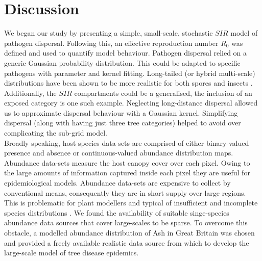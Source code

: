 \section{Discussion}
\label{section:disscussion}
We began our study by presenting a simple, small-scale, stochastic $SIR$ model of pathogen dispersal. Following this, an effective reproduction number $R_0$ was defined and used to quantify model behaviour. Pathogen dispersal relied on a generic Gaussian probability distribution. This could be adapted to specific pathogens with parameter and kernel fitting. Long-tailed (or hybrid multi-scale) distributions have been shown to be more realistic for both spores and insects \cite{long-range-dispersal}. Additionally, the $SIR$ compartments could be a generalised, the inclusion of an exposed category is one such example. Neglecting long-distance dispersal allowed us to approximate dispersal behaviour with a Gaussian kernel. Simplifying dispersal (along with having just three tree categories) helped to avoid over complicating the sub-grid model.\\ 

Broadly speaking, host species data-sets are comprised of either binary-valued presence and absence or continuous-valued abundance distribution maps. Abundance data-sets measure the host canopy cover over each pixel. Owing to the large amounts of information captured inside each pixel they are useful for epidemiological models. Abundance data-sets are expensive to collect by conventional means, consequently they are in short supply over large regions. This is problematic for plant modellers and typical of insufficient and incomplete species distributions \cite{13-challenges}. We found the availability of suitable singe-species abundance data sources that cover large-scales to be sparse. To overcome this obstacle, a modelled abundance distribution of Ash in Great Britain \cite{hill.data} was chosen and provided a freely available realistic data source from which to develop the large-scale model of tree disease epidemics.\\

